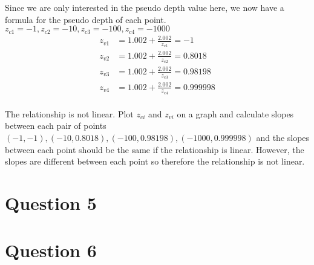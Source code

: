 \documentclass{article} %
\begin{document}
Since we are only interested in the pseudo depth value here, we now have a formula for the pseudo depth of each point.
$z_{c1}=-1, z_{c2}=-10, z_{c3} = -100, z_{c4} = -1000$ 
\begin{align*}
z_{v1} &= 1.002 + \frac{2.002}{z_{c1}} = -1\\
z_{v2} &= 1.002 + \frac{2.002}{z_{c2}} = 0.8018\\
z_{v3} &= 1.002 + \frac{2.002}{z_{c3}} = 0.98198\\
z_{v4} &= 1.002 + \frac{2.002}{z_{c4}} = 0.999998\\
\end{align*}

The relationship is not linear. Plot $z_{ci}$ and $z_{vi}$ on a graph and calculate slopes between each pair of points $(-1, -1), (-10, 0.8018), (-100, 0.98198), (-1000, 0.999998)$ and the slopes between each point should be the same if the relationship is linear. However, the slopes are different between each point so therefore the relationship is not linear.


\newpage
\section{Question 5}


\newpage
\section{Question 6}
\end{document}
